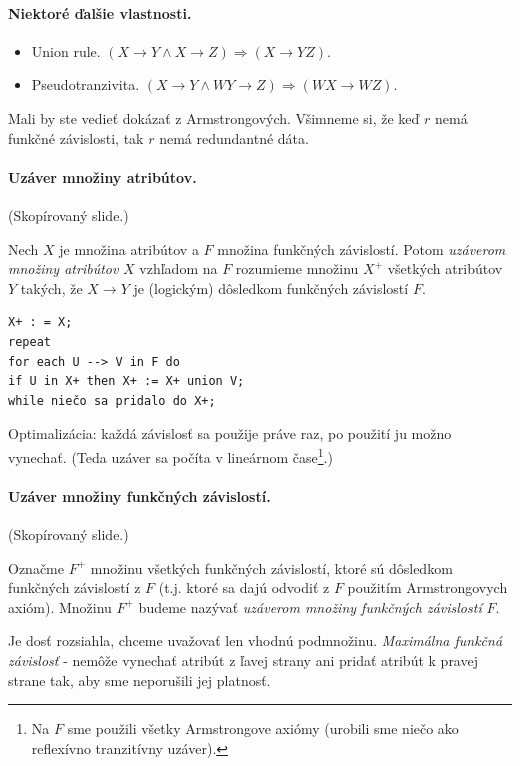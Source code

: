 \documentclass[10pt,a4paper]{article}
\begin{document}
 
\paragraph{Niektoré ďalšie vlastnosti.}
 
\begin{itemize}
\item Union rule. $(X \rightarrow Y \wedge X \rightarrow Z) \Rightarrow (X \rightarrow YZ)$.
\item Pseudotranzivita. $(X \rightarrow Y \wedge WY \rightarrow Z) \Rightarrow (WX \rightarrow WZ)$.
\end{itemize}

Mali by ste vedieť dokázať z Armstrongových.
Všimneme si, že keď $r$ nemá funkčné závislosti, tak $r$ nemá redundantné dáta.  

\paragraph{Uzáver množiny atribútov.}
(Skopírovaný slide.)

Nech $X$ je množina atribútov a $F$ množina funkčných
závislostí. Potom \emph{uzáverom množiny atribútov} $X$ vzhľadom na $F$
rozumieme množinu $X^+$ všetkých atribútov $Y$ takých, že $X \rightarrow Y$ je
(logickým) dôsledkom funkčných závislostí $F$. 
 
\begin{verbatim}
X+ : = X;
repeat
for each U --> V in F do
if U in X+ then X+ := X+ union V;
while niečo sa pridalo do X+;
\end{verbatim}

Optimalizácia: každá závislosť sa použije práve raz, po použití ju
možno vynechať. (Teda uzáver sa počíta v lineárnom čase\footnote{
Na $F$ sme použili všetky Armstrongove axiómy (urobili sme niečo ako reflexívno tranzitívny uzáver). 
}.)

\paragraph{Uzáver množiny funkčných závislostí.}
(Skopírovaný slide.)

Označme $F^+$ množinu všetkých funkčných závislostí,
ktoré sú dôsledkom funkčných závislostí z $F$ (t.j. ktoré sa dajú
odvodiť z $F$ použitím Armstrongovych axióm). Množinu $F^+$ budeme
nazývať \emph{uzáverom množiny funkčných závislostí} $F$.

Je dosť rozsiahla, chceme uvažovať len vhodnú podmnožinu. 
\emph{Maximálna funkčná závislosť} - nemôže vynechať atribút z ľavej strany ani pridať atribút k pravej strane tak, aby sme neporušili jej platnosť. 
\end{document}
